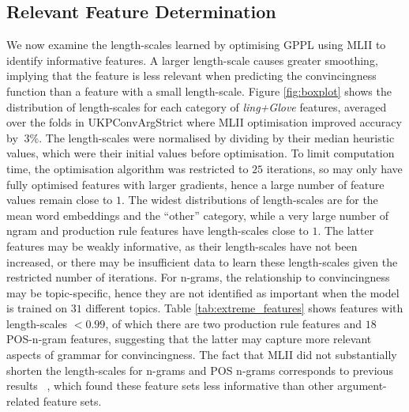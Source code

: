 \subsection{Relevant Feature Determination}

We now examine the length-scales learned by optimising GPPL using MLII  
to identify informative features. 
A larger length-scale causes greater smoothing, 
implying that the feature is less relevant when predicting the convincingness function
than a feature with a small length-scale. 
Figure \ref{fig:boxplot} shows the distribution of length-scales for each category of
\emph{ling+Glove} features, averaged over the folds in UKPConvArgStrict where MLII
optimisation improved accuracy by $\>3\%$. The length-scales
were normalised by dividing by their median heuristic values, 
which were their initial values before optimisation.
To limit computation time, the optimisation algorithm was restricted to $25$ iterations, so may only have fully optimised features with larger gradients, 
hence a large number of feature values remain close to $1$.
The widest distributions of length-scales are for the mean word embeddings and the ``other'' category, while a very large number of ngram and production rule features 
have length-scales close to $1$. The latter features may be weakly informative, 
as their length-scales have not been increased, or there may be insufficient 
data to learn these length-scales given the restricted number of iterations.
For n-grams, the relationship to convincingness may be topic-specific, 
hence they are not identified as important when the model is trained on $31$ different topics. 
Table \ref{tab:extreme_features} shows features with length-scales $<0.99$,
of which there are two production rule features and $18$ POS-n-gram features,
suggesting that the latter may capture more relevant aspects of grammar for convincingness. 
The fact that MLII did not substantially shorten the length-scales for n-grams and POS n-grams 
corresponds to previous results ~\cite{persing2017can}, which found these feature sets less informative than other argument-related feature sets.
 
